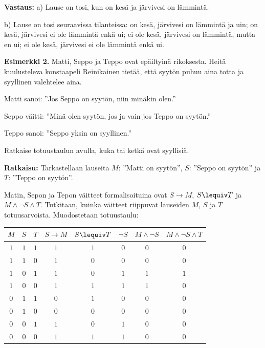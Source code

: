 {\bf Vastaus: } a) Lause on tosi, kun on kesä ja järvivesi on lämmintä.

b) Lause on tosi seuraavissa tilanteissa: on kesä, järvivesi on lämmintä 
ja uin; on kesä, järvivesi ei ole lämmintä enkä ui; ei ole 
kesä, järvivesi on lämmintä, mutta en ui; ei ole kesä, 
järvivesi ei ole lämmintä enkä ui.

{\bf Esimerkki 2.}
Matti, Seppo ja Teppo ovat epäiltyinä rikoksesta. Heitä kuulusteleva konstaapeli Reinikainen tietää, että syytön puhuu aina totta ja syyllinen valehtelee aina.

Matti sanoi: ''Jos Seppo on syytön, niin minäkin olen.''

Seppo väitti: ''Minä olen syytön, jos ja vain jos Teppo on syytön.''

Teppo sanoi: ''Seppo yksin on syyllinen.'' 

Ratkaise totuustaulun avulla, kuka tai ketkä ovat syyllisiä.

{\bf Ratkaisu:} Tarkastellaan lauseita $M$: ''Matti on syytön'', $S$: ''Seppo on syytön'' ja $T$: ''Teppo on syytön''.

Matin, Sepon ja Tepon väitteet formalisoituina ovat $S\to M$, $S\lequiv T$
ja $M\land \lnot S \land T$. Tutkitaan, kuinka väitteet riippuvat lauseiden $M$, $S$ ja $T$ totuusarvoista. Muodostetaan totuustaulu:

\bigskip

\begin{center}
\begin{tabular}{|c|c|c|c|c|c|c|c|}\hline
$M$ & $S$ & $T$ & $S\to M$ & $S\lequiv T$ & $\lnot S$ & $M\land \lnot S$ & $M\land \lnot S \land T$\\ \hline
$1$ & $1$ & $1$ & $1$ & $1$ & $0$ & $0$ & $0$\\ %
$1$ & $1$ & $0$ & $1$ & $0$ & $0$ & $0$ & $0$\\
$1$ & $0$ & $1$ & $1$ & $0$ & $1$ & $1$ & $1$\\
$1$ & $0$ & $0$ & $1$ & $1$ & $1$ & $1$ & $0$\\
$0$ & $1$ & $1$ & $0$ & $1$ & $0$ & $0$ & $0$\\
$0$ & $1$ & $0$ & $0$ & $0$ & $0$ & $0$ & $0$\\
$0$ & $0$ & $1$ & $1$ & $0$ & $1$ & $0$ & $0$\\
$0$ & $0$ & $0$ & $1$ & $1$ & $1$ & $0$ & $0$ \\ \hline
\end{tabular}
\end{center}


